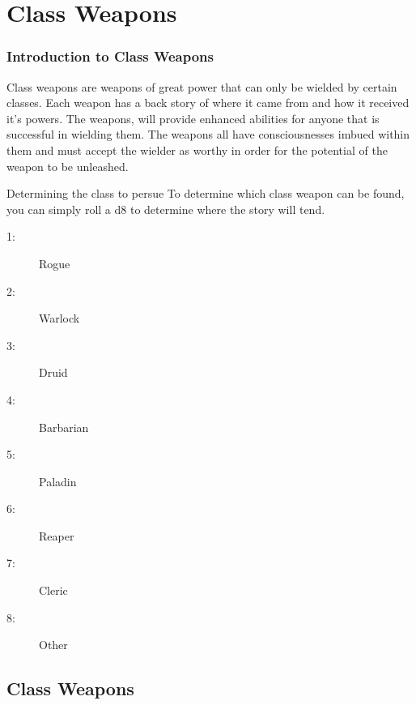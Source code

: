 \chapter{Class Weapons} \label{Weapons}

\subsection{Introduction to Class Weapons}

Class weapons are weapons of great power that can only be wielded by certain classes. Each weapon has a back story of where it came from and how it received it's powers. The weapons, will provide enhanced abilities for anyone that is successful in wielding them. The weapons all have consciousnesses imbued within them and must accept the wielder as worthy in order for the potential of the weapon to be unleashed. 

\begin{commentbox}{Determining the class to persue}
	To determine which class weapon can be found, you can simply roll a d8 to determine where the story will tend.
	\hline
	\begin{multicols}{4}
		\begin{description}
			\item[1:] Rogue 
			\item[2:] Warlock
			\item[3:] Druid
			\item[4:] Barbarian
			\item[5:] Paladin
			\item[6:] Reaper
			\item[7:] Cleric
			\item[8:] Other
		\end{description}
	\end{multicols}
\end{commentbox}

\section{Class Weapons}















%

